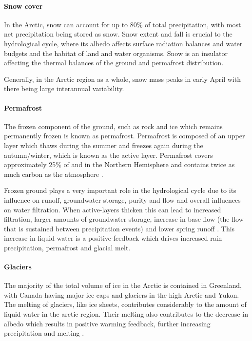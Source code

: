 \documentclass[12pt, oneside]{article}
\begin{document}
\paragraph{Snow cover}
In the Arctic, snow can account for up to 80\% of total precipitation, with most net precipitation being stored as snow. Snow extent and fall is crucial to the hydrological cycle, where its albedo affects surface radiation balances and water budgets and the habitat of land and water organisms. Snow is an insulator affecting the thermal balances of the ground and permafrost distribution. 

Generally, in the Arctic region as a whole, snow mass peaks in early April with there being large interannual variability\cite{dufour2016atmospheric}. 

\paragraph{Permafrost}\label{permafrost}

The frozen component of the ground, such as rock and ice which remains permanently frozen is known as permafrost. Permafrost is composed of an upper layer which thaws during the summer and freezes again during the autumn/winter, which is known as the active layer. Permafrost covers approximately 25\% of and in the Northern Hemisphere and contains twice as much carbon as the atmosphere \cite{permafrost}. 

Frozen ground plays a very important role in the hydrological cycle due to its influence on runoff, groundwater storage, purity and flow and overall influences on water filtration. When active-layers thicken this can lead to  increased filtration, larger amounts of groundwater storage, increase in base flow (the flow that is sustained between precipitation events) and lower spring runoff \cite{instanes2016changes}. This increase in liquid water is a positive-feedback which drives increased rain precipitation, permafrost and glacial melt. 

\paragraph{Glaciers}
The majority of the total volume of ice in the Arctic is contained in Greenland, with Canada having major ice caps and glaciers in the high Arctic and Yukon. The melting of glaciers, like ice sheets, contributes considerably to the amount of liquid water in the arctic region. Their melting also contributes to the decrease in albedo which results in positive warming feedback, further increasing precipitation and melting \cite{vihma2016atmospheric}.  
\end{document}
